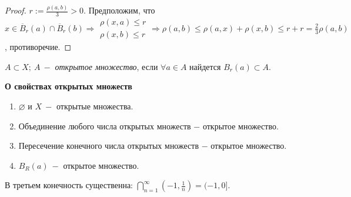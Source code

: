 \begin{proof}
    $r:=\frac{\rho(a, b)}{3}>0.$ Предположим, что $x\in \overline{B}_r(a)\cap \overline{B}_r(b)\Rightarrow\begin{matrix} \rho(x, a)\leq r\\ \rho(x, b)\leq r
    \end{matrix}\Rightarrow \rho(a, b)\leq \rho(a, x)+\rho(x, b)\leq r+r=\frac{2}{3}\rho(a, b)$, противоречие.
\end{proof}

\begin{definition}
    $A\subset X;\ A\ -$ \textit{открытое множество}, если $\forall a\in A$ найдется $B_r(a)\subset A$.
\end{definition}

\begin{theorem}
    \textbf{О свойствах открытых множеств}

    \begin{enumerate}
        \item $\varnothing$ и $X\ -$ открытые множества.

        \item Объединение любого числа открытых множеств $-$ открытое множество. 

        \item Пересечение конечного числа открытых множеств $-$ открытое множество. 

        \item $B_R(a)\ -$ открытое множество.
    \end{enumerate}
\end{theorem}

\begin{remark}
    В третьем конечность существенна: $\bigcap\limits_{n=1}^\infty (-1, \frac{1}{n})=(-1, 0]$.
\end{remark}

